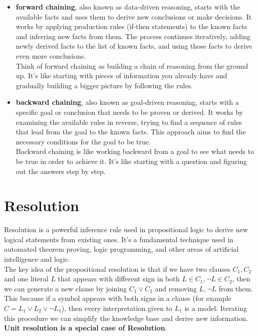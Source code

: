 \documentclass{article}
\begin{document}
\begin{itemize}
    \item \textbf{forward chaining}, also known as data-driven reasoning, starts with the available facts and uses them to derive new conclusions or make decisions. It works by applying production rules (if-then statements) to the known facts and inferring new facts from them. The process continues iteratively, adding newly derived facts to the list of known facts, and using those facts to derive even more conclusions. \\

    Think of forward chaining as building a chain of reasoning from the ground up. It's like starting with pieces of information you already have and gradually building a bigger picture by following the rules.

    \item \textbf{backward chaining}, also known as goal-driven reasoning, starts with a specific goal or conclusion that needs to be proven or derived. It works by examining the available rules in reverse, trying to find a sequence of rules that lead from the goal to the known facts. This approach aims to find the necessary conditions for the goal to be true. \\

    Backward chaining is like working backward from a goal to see what needs to be true in order to achieve it. It's like starting with a question and figuring out the answers step by step.
    
\end{itemize}

\newpage

\section{Resolution}

Resolution is a powerful inference rule used in propositional logic to derive new logical statements from existing ones. It's a fundamental technique used in automated theorem proving, logic programming, and other areas of artificial intelligence and logic. \\

The key idea of the propositional resolution is that if we have two clauses $C_1, C_2$ and one literal $L$ that appears with different sign in both $L \in C_1, \neg L \in C_2$, then we can generate a new clause by joining $C_1 \lor C_2$ and removing $L, \neg L$ from them. This because if a symbol appears with both signs in a clause (for example $C = L_1 \lor L_2 \lor \neg L_1$), then every interpretation given to $L_1$ is a model. Iterating this procedure we can simplify the knowledge base and derive new information. \textbf{Unit resolution is a special case of Resolution}. \\
\end{document}
